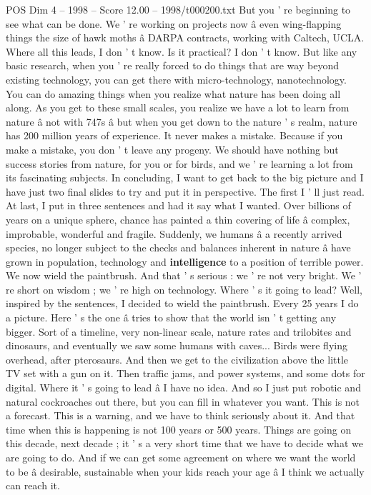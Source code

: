 \begin{textsample}{POS Dim 4 – 1998 – Score 12.00 – 1998/t000200.txt}
But you ' re beginning to see what can be done.
We ' re working on projects now â even wing-flapping things the size of hawk moths â DARPA contracts, working with Caltech, UCLA.
Where all this leads, I don ' t know.
Is it practical?
I don ' t know.
But like any basic research, when you ' re really forced to do things that are way beyond existing technology, you can get there with micro-technology, nanotechnology.
You can do amazing things when you realize what nature has been doing all along.
As you get to these small scales, you realize we have a lot to learn from nature â not with 747s â but when you get down to the nature ' s realm, nature has 200 million years of experience.
It never makes a mistake.
Because if you make a mistake, you don ' t leave any progeny.
We should have nothing but success stories from nature, for you or for birds, and we ' re learning a lot from its fascinating subjects.
In concluding, I want to get back to the big picture and I have just two final slides to try and put it in perspective.
The first I ' ll just read.
At last, I put in three sentences and had it say what I wanted.
Over billions of years on a unique sphere, chance has painted a thin covering of life â complex, improbable, wonderful and fragile.
Suddenly, we humans â a recently arrived species, no longer subject to the checks and balances inherent in nature â have grown in population, technology and \textbf{intelligence} to a position of terrible power.
We now wield the paintbrush.
And that ' s serious : we ' re not very bright.
We ' re short on wisdom ; we ' re high on technology.
Where ' s it going to lead?
Well, inspired by the sentences, I decided to wield the paintbrush.
Every 25 years I do a picture.
Here ' s the one â tries to show that the world isn ' t getting any bigger.
Sort of a timeline, very non-linear scale, nature rates and trilobites and dinosaurs, and eventually we saw some humans with caves...
Birds were flying overhead, after pterosaurs.
And then we get to the civilization above the little TV set with a gun on it.
Then traffic jams, and power systems, and some dots for digital.
Where it ' s going to lead â I have no idea.
And so I just put robotic and natural cockroaches out there, but you can fill in whatever you want.
This is not a forecast.
This is a warning, and we have to think seriously about it.
And that time when this is happening is not 100 years or 500 years.
Things are going on this decade, next decade ; it ' s a very short time that we have to decide what we are going to do.
And if we can get some agreement on where we want the world to be â desirable, sustainable when your kids reach your age â I think we actually can reach it.

\end{textsample}
